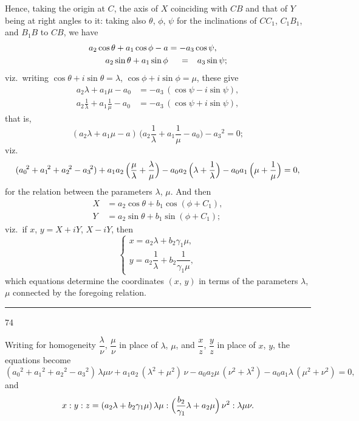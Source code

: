 \documentclass[11pt,a4paper]{book}
\begin{document}
Hence, taking the origin at $C$, the axis of $X$ coinciding with $CB$ and that of $Y$ being at right angles to it: taking also $\theta$, $\phi$, $\psi$ for the inclinations of $CC_1$, $C_1B_1$, and $B_1B$ to $CB$, we have
\begin{alignat*}{2}
a_2\cos\theta + a_1\cos\phi - a &= -a_3\cos\psi, \\
a_2\sin\theta + a_1\sin\phi &\hphantom{{}={}} = \hphantom{-}a_3\sin\psi;
\end{alignat*}
viz.\ writing $\cos\theta+i\sin\theta=\lambda$, $\cos\phi+i\sin\phi=\mu$, these give
\begin{align*}
a_2\lambda + a_1\mu - a_0 &= -a_3\,(\cos\psi - i\sin\psi), \\
a_2\frac{1}{\lambda} + a_1\frac{1}{\mu} - a_0 &= -a_3\,(\cos\psi + i\sin\psi),
\end{align*}
that is,
\[
(a_2\lambda + a_1\mu - a)\,\bigl(a_2\frac{1}{\lambda} + a_1\frac{1}{\mu} - a_0\bigr) - a_3{}^{\!2} = 0;
\]
viz.
\[
(a_0{}^{\!2} + a_1{}^{\!2} + a_2{}^{\!2} - a_3{}^{\!2}) + a_1a_2\,\Bigl(\frac{\mu}{\lambda}+\frac{\lambda}{\mu}\Bigr) - a_0a_2\,\Bigl(\lambda+\frac{1}{\lambda}\Bigr) - a_0a_1\,\Bigl(\mu+\frac{1}{\mu}\Bigr) = 0,
\]
for the relation between the parameters $\lambda$, $\mu$. And then
\begin{align*}
X &= a_2\cos\theta + b_1\cos(\phi+C_1), \\
Y &= a_2\sin\theta + b_1\sin(\phi+C_1);
\end{align*}
viz.\ if $x$, $y = X+iY$, $X-iY$, then
\[
\begin{cases}
x = a_2\lambda + b_2\gamma_1\mu, \\[4pt]
y = a_2\dfrac{1}{\lambda} + b_2\dfrac{1}{\gamma_1\mu},
\end{cases}
\]
which equations determine the coordinates $(x,\,y)$ in terms of the parameters $\lambda$, $\mu$ connected by the foregoing relation.

\vspace{1ex}
\noindent\rule{2em}{0.4pt}\hfill 74

\newpage

\noindent
Writing for homogeneity $\dfrac{\lambda}{\nu}$, $\dfrac{\mu}{\nu}$ in place of $\lambda$, $\mu$, and $\dfrac{x}{z}$, $\dfrac{y}{z}$ in place of $x$, $y$, the equations become
\[
(a_0{}^{\!2} + a_1{}^{\!2} + a_2{}^{\!2} - a_3{}^{\!2})\,\lambda\mu\nu + a_1a_2\,(\lambda^2+\mu^2)\,\nu - a_0a_2\mu\,(\nu^2+\lambda^2) - a_0a_1\lambda\,(\mu^2+\nu^2) = 0,
\]
and
\[
x:y:z = (a_2\lambda + b_2\gamma_1\mu)\,\lambda\mu : \Bigl(\frac{b_2}{\gamma_1}\lambda + a_2\mu\Bigr)\,\nu^2 : \lambda\mu\nu.
\]
\end{document}
